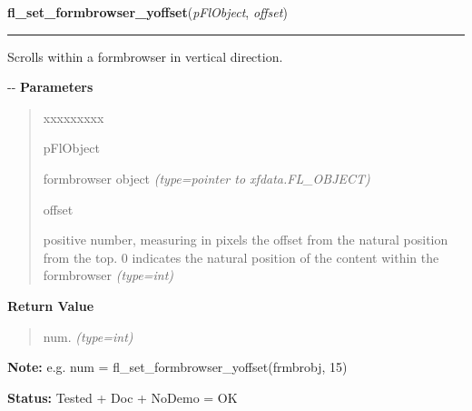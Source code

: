     \vspace{0.5ex}

\hspace{.8\funcindent}\begin{boxedminipage}{\funcwidth}

    \raggedright \textbf{fl\_set\_formbrowser\_yoffset}(\textit{pFlObject}, \textit{offset})

    \vspace{-1.5ex}

    \rule{\textwidth}{0.5\fboxrule}
\setlength{\parskip}{2ex}

Scrolls within a formbrowser in vertical direction.

-{}-
\setlength{\parskip}{1ex}
      \textbf{Parameters}
      \vspace{-1ex}

      \begin{quote}
        \begin{Ventry}{xxxxxxxxx}

          \item[pFlObject]


formbrowser object
            {\it (type=pointer to xfdata.FL\_OBJECT)}

          \item[offset]


positive number, measuring in pixels the offset from the natural
position from the top. 0 indicates the natural position of the
content within the formbrowser
            {\it (type=int)}

        \end{Ventry}

      \end{quote}

      \textbf{Return Value}
    \vspace{-1ex}

      \begin{quote}

num.
      {\it (type=int)}

      \end{quote}

\textbf{Note:} 
e.g. num = fl\_set\_formbrowser\_yoffset(frmbrobj, 15)


\textbf{Status:} 
Tested + Doc + NoDemo = OK


    \end{boxedminipage}

    \label{xformslib:flformbrowser:fl_get_formbrowser_xoffset}

